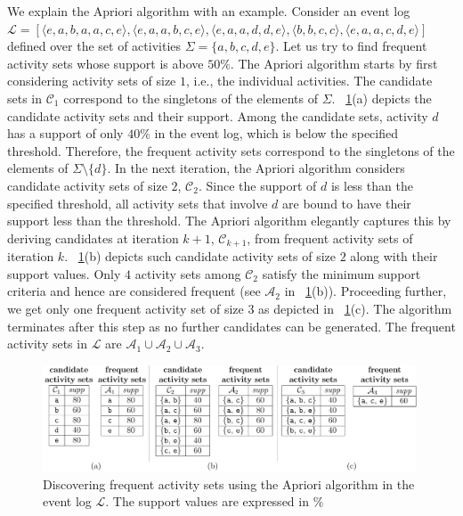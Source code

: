  We explain the Apriori algorithm with an example. Consider an event log $\mathcal{L} =
 [
 \langle e, a, b, a, a, c, e \rangle,
 \langle e, a, a, b, c, e \rangle,
 \langle e, a, a, d, d, e \rangle,
 \langle b, b, c, c \rangle,
 \langle e, a, a, c, d, e \rangle]$
 defined over the set of activities $\Sigma = \{ a, b, c, d, e\}$.
 Let us try to find frequent activity sets whose support is above $50\%$.
 The Apriori algorithm starts by first considering activity sets of size $1$,
 i.e., the individual activities. The candidate sets in $\mathcal{C}_1$ correspond to the singletons of the elements of $\Sigma$.
 \figurename~\ref{fig:Apriorialgorithmexample}(a) depicts the candidate activity sets and their support.
 Among the candidate sets, activity $d$ has a support of only $40\%$ in the event log,
 which is below the specified threshold. Therefore, the frequent activity sets correspond to the singletons of the elements of
 $\Sigma\setminus\{ d \}$. In the next iteration, the Apriori algorithm considers
 candidate activity sets of size $2$, $\mathcal{C}_2$. Since the support of $d$ is less than the specified threshold,
 all activity sets that involve $d$ are bound to have their support less than the threshold.
 The Apriori algorithm elegantly captures this by deriving candidates at iteration $k+1$, $\mathcal{C}_{k+1}$,
 from frequent activity sets of iteration $k$. \figurename~\ref{fig:Apriorialgorithmexample}(b) depicts
 such candidate activity sets of size $2$ along with their support values. Only $4$ activity sets among
 $\mathcal{C}_2$ satisfy the minimum support criteria and hence are considered frequent
 (see $\mathcal{A}_2$ in \figurename~\ref{fig:Apriorialgorithmexample}(b)).
 Proceeding further, we get only one frequent activity set of size $3$ as
 depicted in \figurename~\ref{fig:Apriorialgorithmexample}(c). The algorithm
 terminates after this step as no further candidates can be generated.
 The frequent activity sets in $\mathcal{L}$ are $\mathcal{A}_1 \cup \mathcal{A}_2 \cup \mathcal{A}_3$.
 \begin{figure}[!t]
 \centering
 \includegraphics[width=0.99\textwidth]{images/AprioriExample}
 \caption{Discovering frequent activity sets using the Apriori algorithm in the event log $\mathcal{L}$. The support values are expressed in $\%$}
 \label{fig:Apriorialgorithmexample}
 \end{figure}

